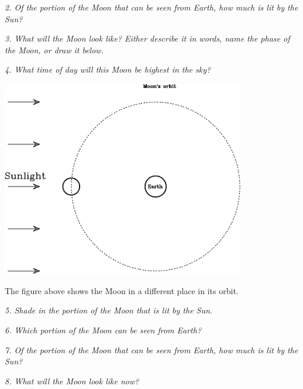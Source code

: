 \documentclass[11pt]{article}
\begin{document}
\vspace{0.8in}

{\it 2. Of the portion of the Moon that can be seen from Earth, how much is lit by the Sun?}

\vspace{0.8in}

{\it 3. What will the Moon look like? Either describe it in words, name the phase of the Moon, or draw it below.}
	
	\vspace{1.2in}
	
{\it 4. What time of day will this Moon be highest in the sky?}
\newpage

\newpage
\includegraphics[width=0.8\textwidth]{moon-diagram-new.pdf}


The figure above shows the Moon in a different place in its orbit.

{\it 5. Shade in the portion of the Moon that is lit by the Sun.}

{\it 6. Which portion of the Moon can be seen from Earth? }

\vspace{0.9in}

{\it 7. Of the portion of the Moon that can be seen from Earth, how much is lit by the Sun?}

\vspace{0.9in}

{\it 8. What will the Moon look like now?}

\vspace{1.8in}

\newpage
\end{document}
